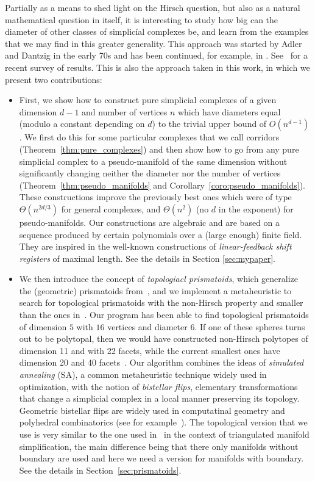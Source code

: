 \documentclass[12pt,a4paper]{article}
\theoremstyle{plain}
\theoremstyle{definition}
\begin{document}
Partially as a means to shed light on the Hirsch question, but also as a natural mathematical question in itself, it is interesting to study how big can the diameter of other classes of simplicíal complexes be, and learn from the examples that we may find in this greater generality. This approach was started by Adler and Dantzig in the early 70s and has been continued, for example, in \cite{ManiWalkup,nonPolytopal}. See~\cite{Santos:progress} for a recent survey of results. This is also the approach taken in this work, in which we present two contributions:

\begin{itemize}
\item First, we show how to construct pure simplicial complexes of a given dimension $d-1$ and number of vertices $n$ which have diameters equal (modulo a constant depending on $d$) to the trivial upper bound of $O(n^{d-1})$. We first do this for some particular complexes that we call corridors 
(Theorem~\ref{thm:pure_complexes}) and then show how to go from any pure simplicial complex to a pseudo-manifold of the same dimension without significantly changing neither the diameter nor the number of vertices (Theorem~\ref{thm:pseudo_manifolds} and Corollary~\ref{coro:pseudo_manifolds}). These constructions improve the previously best ones which were of type $\Theta(n^{2d/3})$ for general complexes, and $\Theta(n^2)$ (no $d$ in the exponent) for pseudo-manifolds. Our constructions are algebraic and are based on a sequence produced by certain polynomials over a (large enough) finite field. They are inspired in the well-known constructions of \emph{linear-feedback shift registers} of maximal length. See the details in Section \ref{sec:mypaper}.

\item We then introduce the concept of \emph{topologiacl prismatoids}, which generalize the (geometric) prismatoids from~\cite{counterexample,improvement}, and we implement a metaheuristic to search for topological prismatoids with the non-Hirsch property and smaller than the ones in~\cite{counterexample,improvement}. Our program has been able to find topological prismatoids of dimension $5$ with $16$ vertices and diameter $6$. If one of these spheres turns out to be polytopal, then we would have constructed non-Hirsch polytopes of dimension 11 and with 22 facets, while the current smallest ones have dimension 20 and 40 facets~\cite{improvement}. Our algorithm combines the ideas of  \emph{simulated annealing} (SA), a common metaheuristic technique widely used in optimization, with the notion of \emph{bistellar flips}, elementary transformations that change a simplicial complex in a local manner preserving its topology. Geometric bistellar flips are widely used in computatinal geometry and polyhedral combinatorics (see for example~\cite{SantosFlips}). The topological version that we use is very similar to the one used in~\cite{Lutz} in the context of triangulated manifold simplification, the main difference being that there only manifolds without boundary are used and here we need a version for manifolds with boundary. See the details in Section~\ref{sec:prismatoids}.
\end{itemize}
\end{document}
